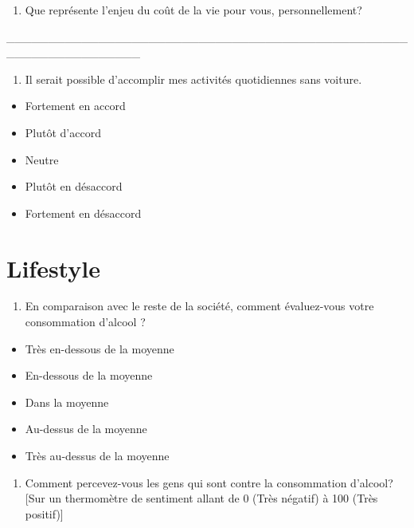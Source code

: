 \documentclass[
  letterpaper,
  DIV=11,
  numbers=noendperiod]{scrreprt}
\providecommand{\tightlist}{%
  \setlength{\itemsep}{0pt}\setlength{\parskip}{0pt}}\usepackage{longtable,booktabs,array}
\begin{document}
\begin{enumerate}
\def\labelenumi{\arabic{enumi}.}
\setcounter{enumi}{49}
\tightlist
\item
  Que représente l'enjeu du coût de la vie pour vous, personnellement?
\end{enumerate}

\_\_\_\_\_\_\_\_\_\_\_\_\_\_\_\_\_\_\_\_\_\_\_\_\_\_\_\_\_\_\_\_\_\_\_\_\_\_\_\_\_\_\_\_\_\_\_\_\_\_\_\_\_\_\_\_\_\_\_\_\_\_\_\_

\begin{enumerate}
\def\labelenumi{\arabic{enumi}.}
\setcounter{enumi}{50}
\tightlist
\item
  Il serait possible d'accomplir mes activités quotidiennes sans
  voiture.
\end{enumerate}

\begin{itemize}
\tightlist
\item
  Fortement en accord
\item
  Plutôt d'accord
\item
  Neutre
\item
  Plutôt en désaccord
\item
  Fortement en désaccord
\end{itemize}

\section{Lifestyle}\label{lifestyle}

\begin{enumerate}
\def\labelenumi{\arabic{enumi}.}
\setcounter{enumi}{51}
\tightlist
\item
  En comparaison avec le reste de la société, comment évaluez-vous votre
  consommation d'alcool ?
\end{enumerate}

\begin{itemize}
\tightlist
\item
  Très en-dessous de la moyenne
\item
  En-dessous de la moyenne
\item
  Dans la moyenne
\item
  Au-dessus de la moyenne
\item
  Très au-dessus de la moyenne
\end{itemize}

\begin{enumerate}
\def\labelenumi{\arabic{enumi}.}
\setcounter{enumi}{52}
\tightlist
\item
  Comment percevez-vous les gens qui sont contre la consommation
  d'alcool? {[}Sur un thermomètre de sentiment allant de 0 (Très
  négatif) à 100 (Très positif){]}
\end{enumerate}
\end{document}
